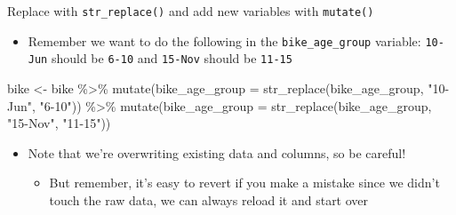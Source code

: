 \documentclass[
  ignorenonframetext,
]{beamer}
\newenvironment{Shaded}{\begin{snugshade}}{\end{snugshade}}
\newcommand{\AttributeTok}[1]{\textcolor[rgb]{0.77,0.63,0.00}{#1}}
\newcommand{\FunctionTok}[1]{\textcolor[rgb]{0.00,0.00,0.00}{#1}}
\newcommand{\NormalTok}[1]{#1}
\newcommand{\OtherTok}[1]{\textcolor[rgb]{0.56,0.35,0.01}{#1}}
\newcommand{\SpecialCharTok}[1]{\textcolor[rgb]{0.00,0.00,0.00}{#1}}
\newcommand{\StringTok}[1]{\textcolor[rgb]{0.31,0.60,0.02}{#1}}
\providecommand{\tightlist}{%
  \setlength{\itemsep}{0pt}\setlength{\parskip}{0pt}}
\begin{document}
\begin{frame}[fragile]{Replace with \texttt{str\_replace()} and add new
variables with \texttt{mutate()}}
\protect\hypertarget{replace-with-str_replace-and-add-new-variables-with-mutate}{}
\begin{itemize}
\tightlist
\item
  Remember we want to do the following in the \texttt{bike\_age\_group}
  variable: \texttt{10-Jun} should be \texttt{6-10} and \texttt{15-Nov}
  should be \texttt{11-15}
\end{itemize}

\begin{Shaded}
\begin{Highlighting}[]
\NormalTok{bike }\OtherTok{\textless{}{-}}\NormalTok{ bike }\SpecialCharTok{\%\textgreater{}\%}
  \FunctionTok{mutate}\NormalTok{(}\AttributeTok{bike\_age\_group =} \FunctionTok{str\_replace}\NormalTok{(bike\_age\_group, }\StringTok{"10{-}Jun"}\NormalTok{, }\StringTok{"6{-}10"}\NormalTok{)) }\SpecialCharTok{\%\textgreater{}\%}
  \FunctionTok{mutate}\NormalTok{(}\AttributeTok{bike\_age\_group =} \FunctionTok{str\_replace}\NormalTok{(bike\_age\_group, }\StringTok{"15{-}Nov"}\NormalTok{, }\StringTok{"11{-}15"}\NormalTok{))}
\end{Highlighting}
\end{Shaded}

\begin{itemize}
\tightlist
\item
  Note that we're overwriting existing data and columns, so be careful!

  \begin{itemize}
  \tightlist
  \item
    But remember, it's easy to revert if you make a mistake since we
    didn't touch the raw data, we can always reload it and start over
  \end{itemize}
\end{itemize}
\end{frame}
\end{document}
